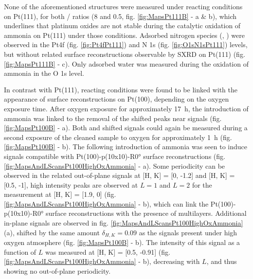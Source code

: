 None of the aforementioned structures were measured under reacting conditions on Pt(111), for both / ratios (\num{8} and \num{0.5}, fig. \ref{fig:MapsPt111B} - a \& b), which underlines that platinum oxides are not stable during the catalytic oxidation of ammonia on Pt(111) under those conditions.
Adsorbed nitrogen species (, ) were observed in the Pt4f (fig. \ref{fig:Pt4fPt111}) and N 1s (fig. \ref{fig:O1sN1sPt111}) levels, but without related surface reconstructions observable by SXRD on Pt(111) (fig. \ref{fig:MapsPt111B} - c).
Only adsorbed water was measured during the oxidation of ammonia in the O 1s level.

In contrast with Pt(111), reacting conditions were found to be linked with the appearance of surface reconstructions on Pt(100), depending on the oxygen exposure time.
After oxygen exposure for approximately \qty{17}{\hour}, the introduction of ammonia was linked to the removal of the shifted peaks near  signals (fig. \ref{fig:MapsPt100B} - a).
Both  and shifted signals could again be measured during a second exposure of the cleaned sample to oxygen for approximately \qty{1}{\hour} (fig. \ref{fig:MapsPt100B} - b).
The following introduction of ammonia was seen to induce signals compatible with Pt(100)-p(10x10)-R\ang{0} surface reconstructions (fig. \ref{fig:MapsAndLScansPt100HighOxAmmonia} - a).
Some periodicity can be observed in the related out-of-plane signals at [H, K] = [0, -1.2] and [H, K] = [0.5, -1], high intensity peaks are observed at $L=1$ and $L=2$ for the measurement at [H, K] = [1.9, 0] (fig. \ref{fig:MapsAndLScansPt100HighOxAmmonia} - b), which can link the Pt(100)-p(10x10)-R\ang{0} surface reconstructions with the presence of multilayers.
Additional in-plane signals are observed in fig. \ref{fig:MapsAndLScansPt100HighOxAmmonia} (a), shifted by the same amount $\delta_{H, K}=0.09$ as the signals present under high oxygen atmosphere (fig. \ref{fig:MapsPt100B} - b).
The intensity of this signal as a function of $L$ was measured at [H, K] = [0.5, -0.91] (fig. \ref{fig:MapsAndLScansPt100HighOxAmmonia} - b), decreasing with $L$, and thus showing no out-of-plane periodicity.


